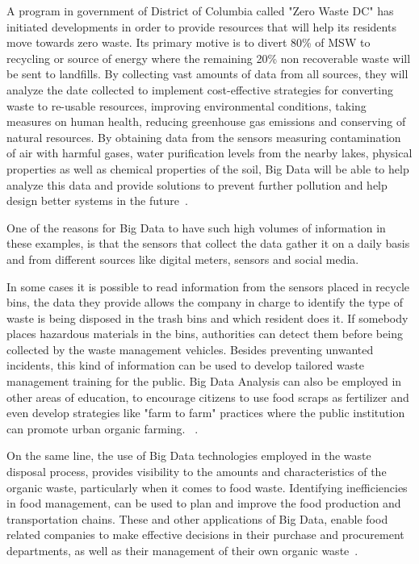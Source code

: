 \documentclass[sigconf]{acmart}
\begin{document}
A program in government of District of Columbia called "Zero Waste DC" has initiated developments in order to provide resources that will help its residents move towards zero waste. Its primary motive is to divert 80\% of MSW to recycling or source of energy where the remaining 20\% non recoverable waste will be sent to landfills. By collecting vast amounts of data from all sources, they will analyze  the date collected to implement cost-effective strategies for converting waste to re-usable resources, improving environmental conditions, taking measures on human health, reducing greenhouse gas emissions and conserving of natural resources. By obtaining data from the sensors measuring contamination of air with harmful gases, water purification levels from the nearby lakes, physical properties as well as chemical properties of the soil, Big Data will be able to help analyze this data and provide solutions to prevent further pollution and help design better systems in the future~\cite{rosengren2017}.

One of the reasons for Big Data to have such high volumes of information in these examples, is that the sensors that collect the data gather it on a daily basis and from different sources like digital meters, sensors and social media. 

In some cases it is possible to read information from the sensors placed in recycle bins, the data they provide allows the company in charge to identify the type of waste is being disposed in the trash bins and which resident does it. If somebody places hazardous materials in the bins, authorities can detect them before  being collected by the waste management vehicles. Besides preventing unwanted incidents, this kind of information can be used to develop tailored waste management training for the public. Big Data Analysis can also be employed in other areas of education, to encourage citizens to use food scraps as fertilizer and even develop strategies like "farm to farm" practices where the public institution can promote urban organic farming. ~\cite{james2012}.

On the same line, the use of Big Data technologies employed in the  waste disposal process, provides visibility to the amounts and characteristics of the organic waste, particularly when it comes to food waste. Identifying inefficiencies in food management, can be used to plan and improve the food production and transportation chains. These and other applications of Big Data, enable food related companies to make effective decisions in their purchase and procurement departments, as well as their management of their own organic waste~\cite{frank2016}.
\end{document}
